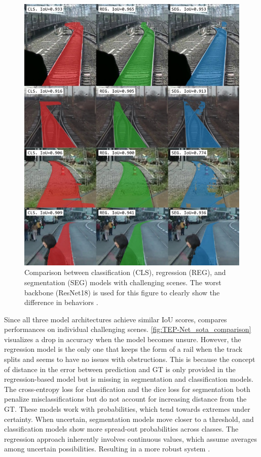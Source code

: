 \begin{figure}[H]
    \centering
    \includegraphics[width=0.7\linewidth]{PICs/Baselinepaper/comparison_sota_tep-net.jpg}
    \caption{Comparison between classification (CLS), regression (REG), and segmentation (SEG) models with challenging scenes.
    The worst backbone (ResNet18) is used for this figure to clearly show the difference in behaviors \cite{tepNet2024}.}
    \label{fig:TEP-Net_sota_comparison}
\end{figure}

\noindent Since all three model architectures achieve similar \ac{IoU} scores, \cite{tepNet2024} compares performances on individual challenging scenes.
\autoref{fig:TEP-Net_sota_comparison} visualizes a drop in accuracy when the model becomes unsure.
However, the regression model is the only one that keeps the form of a rail when the track splits and seems to have no issues with obstructions.
This is because the concept of distance in the error between prediction and \ac{GT} is only provided in the regression-based model but is missing in segmentation and classification models.
The cross-entropy loss for classification and the dice loss for segmentation both penalize misclassifications but do not account for increasing distance from the \ac{GT}.
These models work with probabilities, which tend towards extremes under certainty.
When uncertain, segmentation models move closer to a threshold, and classification models show more spread-out probabilities across classes.
The regression approach inherently involves continuous values, which assume averages among uncertain possibilities.
Resulting in a more robust system \cite{tepNet2024}.

